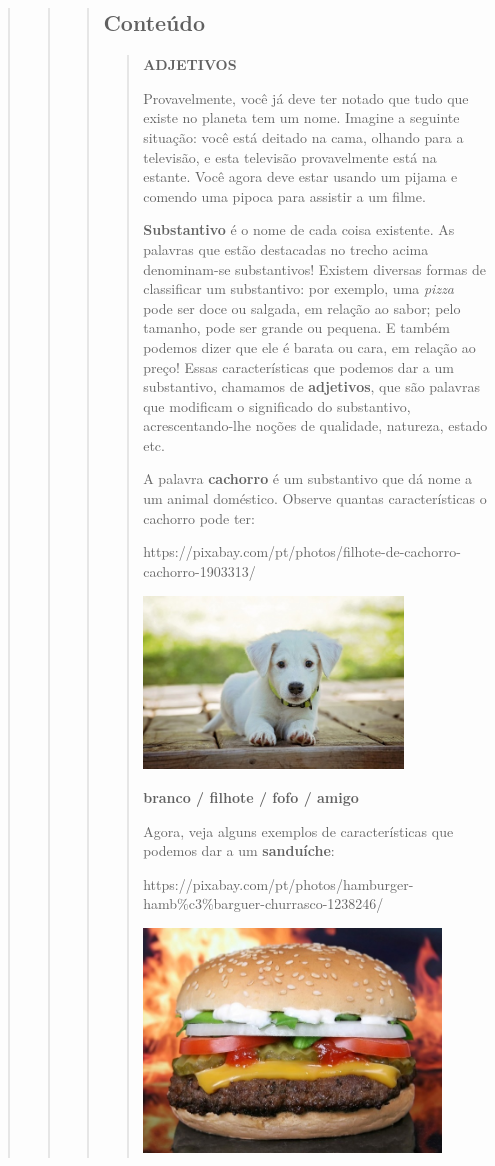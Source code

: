 \begin{quote}
\begin{quote}
\begin{quote}
\subsection{Conteúdo}\label{conteuxfado-6}

\begin{quote}
\textbf{ADJETIVOS}

Provavelmente, você já deve ter notado que tudo que existe no planeta
tem um nome. Imagine a seguinte situação: você está deitado na cama,
olhando para a televisão, e esta televisão provavelmente está na
estante. Você agora deve estar usando um pijama e comendo uma pipoca
para assistir a um filme.

\textbf{Substantivo} é o nome de cada coisa existente. As palavras que
estão destacadas no trecho acima denominam-se substantivos! Existem
diversas formas de classificar um substantivo: por exemplo, uma
\emph{pizza} pode ser doce ou salgada, em relação ao sabor; pelo
tamanho, pode ser grande ou pequena. E também podemos dizer que ele é
barata ou cara, em relação ao preço! Essas características que podemos
dar a um substantivo, chamamos de \textbf{adjetivos}, que são palavras
que modificam o significado do substantivo, acrescentando-lhe noções de
qualidade, natureza, estado etc.

A palavra \textbf{cachorro} é um substantivo que dá nome a um animal
doméstico. Observe quantas características o cachorro pode ter:

https://pixabay.com/pt/photos/filhote-de-cachorro-cachorro-1903313/

\includegraphics[width=2.71875in,height=1.81239in]{media/image21.jpeg}

\textbf{branco / filhote / fofo / amigo}

Agora, veja alguns exemplos de características que podemos dar a um
\textbf{sanduíche}:

https://pixabay.com/pt/photos/hamburger-hamb\%c3\%barguer-churrasco-1238246/

\includegraphics[width=3.11183in,height=2.34375in]{media/image22.jpeg}


\end{quote}
\end{quote}
\end{quote}
\end{quote}
